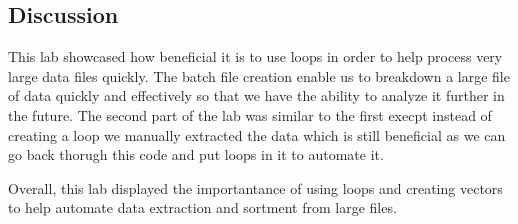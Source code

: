 \documentclass{article}\usepackage[]{graphicx}\usepackage[]{xcolor}
\begin{document}
\begin{multicols}{2}
\section{Discussion}
This lab showcased how beneficial it is to use loops in order to help process very large data files quickly. The batch file creation enable us to breakdown a large file of data quickly and effectively so that we have the ability to analyze it further in the future. The second part of the lab was similar to the first execpt instead of creating a loop we manually extracted the data which is still beneficial as we can go back thorugh this code and put loops in it to automate it. 

Overall, this lab displayed the importantance of using loops and creating vectors to help automate data extraction and sortment from large files.

\vspace{2em}


\begin{tiny}

\end{tiny}

\end{multicols}

\onecolumn
\end{document}
